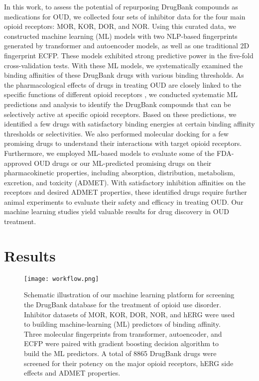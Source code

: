 \documentclass[10pt]{article}
\begin{document}
		In this work, to assess the potential of repurposing DrugBank compounds as medications for OUD, we collected four sets of inhibitor data for the four main opioid receptors: MOR, KOR, DOR, and NOR. Using this curated data, we constructed machine learning (ML) models with two NLP-based fingerprints generated by transformer and autoencoder models, as well as one traditional 2D fingerprint ECFP. These models exhibited strong predictive power in the five-fold cross-validation tests. With these ML models, we systematically examined the binding affinities of these DrugBank drugs with various binding thresholds. As the pharmacological effects of drugs in treating OUD are closely linked to the specific functions of different opioid receptors \cite{wang2019historical}, we conducted systematic ML predictions and analysis to identify the DrugBank compounds that can be selectively active at specific opioid receptors. Based on these predictions, we identified a few drugs with satisfactory binding energies at certain binding affinity thresholds or selectivities. We also performed molecular docking for a few promising drugs to understand their interactions with target opioid receptors. Furthermore, we employed ML-based models to evaluate some of the FDA-approved OUD drugs or our ML-predicted promising drugs on their pharmacokinetic properties, including absorption, distribution, metabolism, excretion, and toxicity (ADMET). With satisfactory inhibition affinities on the receptors and desired ADMET properties, these identified drugs require further animal experiments to evaluate their safety and efficacy in treating OUD. Our machine learning studies yield valuable results for drug discovery in OUD treatment.
		
		
		\section{Results}
		
		\begin{figure}[ht]
			\centering
			\texttt{[image: workflow.png]} 
			\caption{{\footnotesize Schematic illustration of our machine learning platform for screening the DrugBank database for the treatment of opioid use disorder. Inhibitor datasets of MOR, KOR, DOR, NOR, and hERG were used to building machine-learning (ML) predictors of binding affinity. Three molecular fingerprints from transformer, autoencoder, and ECFP were paired with gradient boosting decision algorithm to build the ML predictors. A total of 8865 DrugBank drugs were screened for their potency on the major opioid receptors, hERG side effects and ADMET properties.
			} }
			\label{Fig:work-flow}
		\end{figure} 
		
\end{document}
